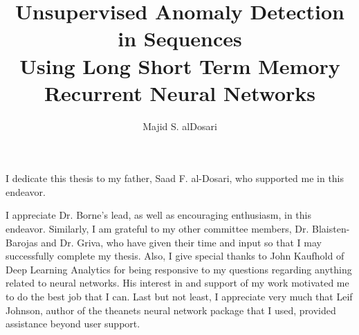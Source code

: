 \documentclass[11 pt]{report}
\begin{document}
\title{
  Unsupervised Anomaly Detection in Sequences\\
  Using Long Short Term Memory \\
  Recurrent Neural Networks} %
\author{
Majid S. alDosari
}
\subject{(Computational Science)}








\signaturepage

\titlepage

\copyrightpage


\dedicationpage

\noindent I dedicate this thesis to my father, Saad F. al-Dosari, who supported me in this endeavor.


\acknowledgementspage

\noindent
I appreciate Dr. Borne's lead, as well as encouraging enthusiasm, in this endeavor.
%
Similarly, I am grateful to my other committee members, Dr. Blaisten-Barojas and Dr. Griva, who have given their time and input so that I may successfully complete my thesis.
%
Also, I give special thanks to John Kaufhold of Deep Learning Analytics for being responsive to my questions regarding anything related to neural networks.
%
His interest in and support of my work motivated me to do the best job that I can.
%
Last but not least, I appreciate very much that Leif Johnson, author of the \textsf{theanets} neural network package that I used, provided assistance beyond user support.
\end{document}
